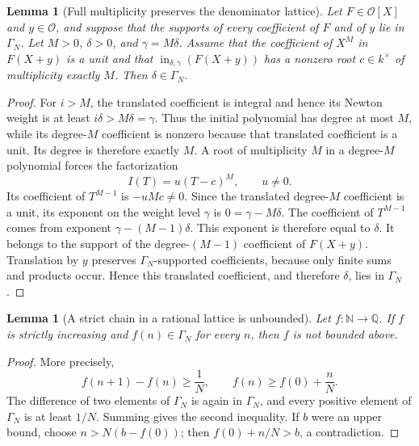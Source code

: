 \documentclass[11pt]{article}
\newcommand{\Init}{\operatorname{in}}
\newcommand{\Ocal}{\mathcal O}
\theoremstyle{proofnote}
\newtheorem{lemma}[theorem]{Lemma}
\begin{document}
\begin{lemma}[Full multiplicity preserves the denominator lattice]
\label{lem:full-multiplicity-denominator}
  Let \(F\in\Ocal[X]\) and \(y\in\Ocal\), and suppose that the supports of
  every coefficient of \(F\) and of \(y\) lie in \(\Gamma_N\).  Let
  \(M>0\), \(\delta>0\), and \(\gamma=M\delta\).  Assume that the coefficient
  of \(X^M\) in \(F(X+y)\) is a unit and that
  \(\Init_{\delta,\gamma}(F(X+y))\) has a nonzero root
  \(c\in k^\times\) of multiplicity exactly \(M\).  Then
  \(\delta\in\Gamma_N\).
\end{lemma}
\begin{proof}
  For \(i>M\), the translated coefficient is integral and hence its Newton
  weight is at least \(i\delta>M\delta=\gamma\).  Thus the initial polynomial
  has degree at most \(M\), while its degree-\(M\) coefficient is nonzero
  because that translated coefficient is a unit.  Its degree is therefore
  exactly \(M\).  A root of multiplicity \(M\) in a degree-\(M\) polynomial
  forces the factorization
  \[
    I(T)=u(T-c)^M,\qquad u\ne0.
  \]
  Its coefficient of \(T^{M-1}\) is \(-uMc\ne0\).  Since the translated
  degree-\(M\) coefficient is a unit, its exponent on the weight level
  \(\gamma\) is \(0=\gamma-M\delta\).  The coefficient of \(T^{M-1}\)
  comes from exponent
  \(\gamma-(M-1)\delta\).  This exponent is therefore equal to
  \(\delta\).  It belongs to the support of the degree-\((M-1)\)
  coefficient of \(F(X+y)\).  Translation by \(y\) preserves
  \(\Gamma_N\)-supported coefficients, because only finite sums and products
  occur.  Hence this translated coefficient, and therefore \(\delta\), lies
  in \(\Gamma_N\).
\end{proof}

\begin{lemma}[A strict chain in a rational lattice is unbounded]
\label{lem:lattice-chain}
  Let \(f:\mathbb N\to\mathbb Q\).  If \(f\) is strictly increasing and
  \(f(n)\in\Gamma_N\) for every \(n\), then \(f\) is not bounded above.
\end{lemma}
\begin{proof}
  More precisely,
  \[
    f(n+1)-f(n)\ge\frac1N,\qquad
    f(n)\ge f(0)+\frac nN.
  \]
  The difference of two elements of \(\Gamma_N\) is again in \(\Gamma_N\),
  and every positive element of \(\Gamma_N\) is at least \(1/N\).
  Summing gives the second inequality.  If \(b\) were an upper bound, choose
  \(n>N(b-f(0))\); then \(f(0)+n/N>b\), a contradiction.
\end{proof}
\end{document}
